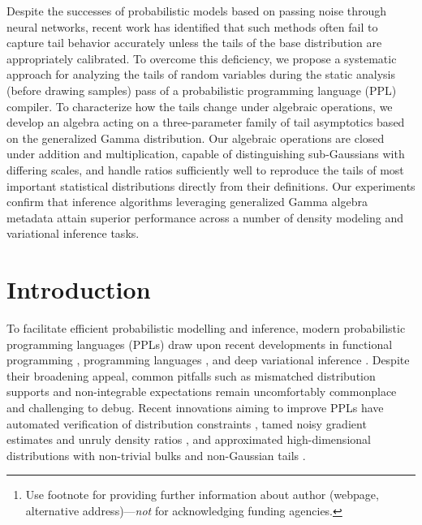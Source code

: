 \documentclass[thesis.tex]{subfiles}
\author{%
  David S.~Hippocampus\thanks{Use footnote for providing further information
    about author (webpage, alternative address)---\emph{not} for acknowledging
    funding agencies.} \\
  Department of Computer Science\\
  Cranberry-Lemon University\\
  Pittsburgh, PA 15213 \\
  \texttt{hippo@cs.cranberry-lemon.edu} \\
}
\begin{document}

	Despite the successes of probabilistic models based on passing noise through
	neural networks, recent work has identified that such methods often fail to
	capture tail behavior accurately unless the tails of the base distribution
	are appropriately calibrated. To overcome this deficiency, we propose a
	systematic approach for analyzing the tails of random variables during the
	static analysis (before drawing samples) pass of a probabilistic programming
	language (PPL) compiler. To characterize how the tails change under
	algebraic operations, we develop an algebra acting on a three-parameter
	family of tail asymptotics based on the generalized Gamma distribution. Our
	algebraic operations are closed under addition and multiplication, capable
	of distinguishing sub-Gaussians with differing scales, and handle ratios
	sufficiently well to reproduce the tails of most important statistical
	distributions directly from their definitions. Our experiments confirm that
	inference algorithms leveraging generalized Gamma algebra metadata attain
	superior performance across a number of density modeling and variational
	inference tasks.

\section{Introduction}

To facilitate efficient probabilistic modelling and inference, modern probabilistic programming languages (PPLs) draw upon recent developments in functional programming \citep{tolpin2016design},
programming languages \citep{bernstein2019static}, 
and deep variational inference \citep{bingham2019pyro}.
Despite their broadening appeal, common pitfalls such as mismatched
distribution supports \citep{lee2019towards} and non-integrable expectations
\citep{wang2018variational,vehtari2015pareto,yao2018yes} remain uncomfortably
commonplace and challenging to debug.
Recent innovations aiming to improve PPLs have automated verification of
distribution constraints \citep{lee2019towards}, tamed noisy gradient estimates
\citep{eslami2016attend} and unruly density ratios
\citep{vehtari2015pareto,wang2018variational}, and approximated high-dimensional
distributions with non-trivial bulks \citep{papamakarios2021normalizing} and non-Gaussian tails \cite{jaini2020tails}. 
\end{document}
